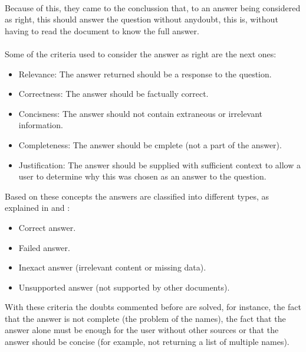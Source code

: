 \paragraph{}
Because of this, they came to the conclussion that, to an answer being considered as right, this should answer the question without anydoubt, this is, without having to read the document to know the full answer.
\paragraph{}
Some of the criteria used to consider the answer as right are the next ones:\cite{Allam2012}
\begin{itemize}
\item Relevance: The answer returned should be a response to the question.
\item Correctness: The answer should be factually correct.
\item Concisness: The answer should not contain extraneous or irrelevant information.
\item Completeness: The answer should be cmplete (not a part of the answer).
\item Justification: The answer should be supplied with sufficient context to allow a user to determine why this was chosen as an answer to the question.
\end{itemize}
Based on these concepts the answers are classified into different types, as explained in \cite{Allam2012} and \cite{Pablo-Sanchez}:
\begin{itemize}
\item Correct answer.
\item Failed answer.
\item Inexact answer (irrelevant content or missing data).
\item Unsupported answer (not supported by other documents).
\end{itemize}
With these criteria the doubts commented before are solved, for instance, the fact that the answer is not complete (the problem of the names), the fact that the answer alone must be enough for the user without other sources or that the answer should be concise (for example, not returning a list of multiple names).
